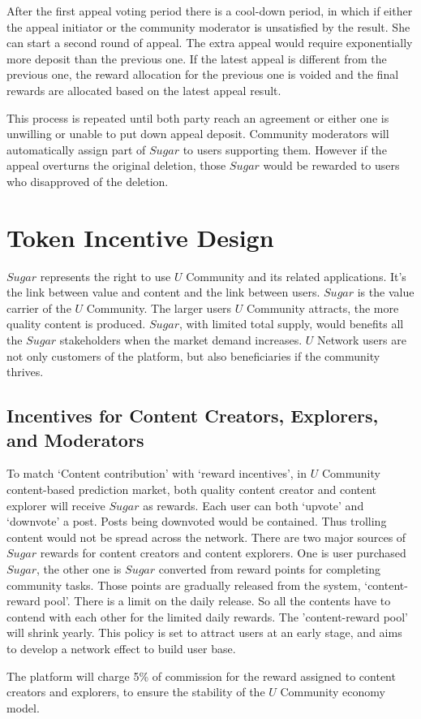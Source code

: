 After the first appeal voting period there is a cool-down period, in which if either the appeal initiator or the community moderator is unsatisfied by the result. She can start a second round of appeal. The extra appeal would require exponentially more deposit than the previous one. If the latest appeal is different from the previous one, the reward allocation for the previous one is voided and the final rewards are allocated based on the latest appeal result. \par
This process is repeated until both party reach an agreement or either one is unwilling or unable to put down appeal deposit. 
Community moderators will automatically assign part of $Sugar$ to users supporting them. However if the appeal overturns the original deletion, those $Sugar$ would be rewarded to users who disapproved of the deletion.  
\section{Token Incentive Design}
$Sugar$ represents the right to use $U$ Community and its related applications. It's the link between value and content and the link between users.
$Sugar$ is the value carrier of the $U$ Community. The larger users $U$ Community attracts, the more quality content is produced. $Sugar$, with limited total supply, would benefits all the $Sugar$ stakeholders when the market demand increases.  
$U$ Network users are not only customers of the platform, but also beneficiaries if the community thrives. 
	
\subsection{Incentives for Content Creators, Explorers, and Moderators} 
To match `Content contribution' with `reward incentives', in $U$ Community content-based prediction market, both quality content creator and content explorer will receive $Sugar$ as rewards.
Each user can both `upvote' and `downvote' a post. Posts being downvoted would be contained. Thus trolling content would not be spread across the network. 
There are two major sources of $Sugar$ rewards for content creators and content explorers. One is user purchased $Sugar$, the other one is $Sugar$ converted from reward points  for completing community tasks.
Those points are gradually released from the system, `content-reward pool'. There is a limit on the daily release. So all the contents have to contend with each other for the limited daily rewards. The 'content-reward pool' will shrink yearly. This policy is set to attract users at an early stage, and aims to develop a network effect to build user base. \par
The platform will charge 5\% of commission for the reward assigned to content creators and explorers, to ensure the stability of the $U$ Community economy model.
